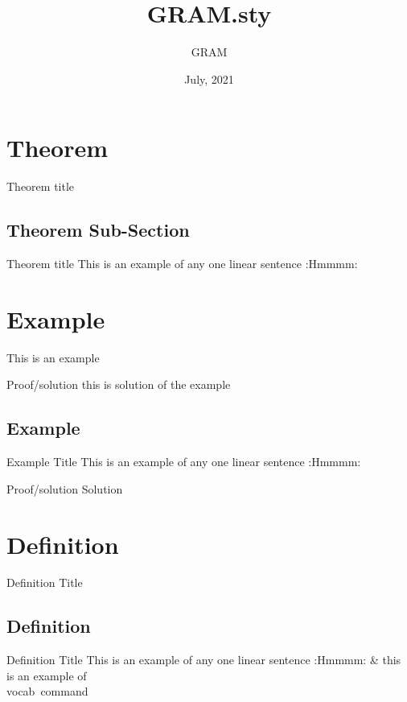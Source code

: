 \documentclass[11pt]{scrartcl}
\title{GRAM.sty}
\author{GRAM}
\date{July, 2021}
\begin{document}
\maketitle
\par
\vspace{2cm}
\tableofcontents

\newpage



\section{Theorem}
\begin{theorem}{Theorem title} 
\lipsum[1]
\end{theorem}
\lipsum[1]

\subsection{Theorem Sub-Section}
\begin{theorem}{Theorem title}
This is an example of any one linear sentence :Hmmmm:
\end{theorem}
\newpage
\section{Example}
\begin{example}{}
This is an example
\end{example}
\begin{examplesolution}{Proof/solution}
this is solution of the example
\end{examplesolution}
\subsection{Example}
\begin{example}{Example Title}
This is an example of any one linear sentence :Hmmmm:
\end{example}
\begin{examplesolution}{Proof/solution}
Solution
\end{examplesolution}
\newpage

\section{Definition}
\begin{definition}{Definition Title}
\lipsum[5]
\end{definition}

\subsection{Definition}
\begin{definition}{Definition Title}
This is an example of any one linear sentence :Hmmmm: \& this is an example of \\vocab\ command  
\end{definition}
\newpage
\end{document}
